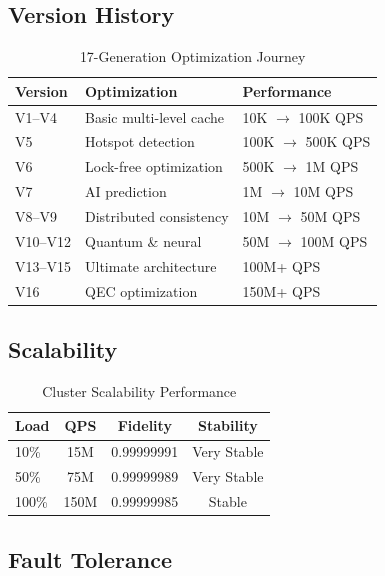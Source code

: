\documentclass[12pt,a4paper]{article}
\theoremstyle{definition}
\begin{document}
\subsection{Version History}

\begin{table}[H]
\centering
\caption{17-Generation Optimization Journey}
\label{tab:history}
\begin{tabular}{lll}
\toprule
\textbf{Version} & \textbf{Optimization} & \textbf{Performance} \\
\midrule
V1--V4 & Basic multi-level cache & 10K $\rightarrow$ 100K QPS \\
V5 & Hotspot detection & 100K $\rightarrow$ 500K QPS \\
V6 & Lock-free optimization & 500K $\rightarrow$ 1M QPS \\
V7 & AI prediction & 1M $\rightarrow$ 10M QPS \\
V8--V9 & Distributed consistency & 10M $\rightarrow$ 50M QPS \\
V10--V12 & Quantum \& neural & 50M $\rightarrow$ 100M QPS \\
V13--V15 & Ultimate architecture & 100M+ QPS \\
V16 & QEC optimization & 150M+ QPS \\
\bottomrule
\end{tabular}
\end{table}

\subsection{Scalability}

\begin{table}[H]
\centering
\caption{Cluster Scalability Performance}
\label{tab:scalability}
\begin{tabular}{lccc}
\toprule
\textbf{Load} & \textbf{QPS} & \textbf{Fidelity} & \textbf{Stability} \\
\midrule
10\% & 15M & 0.99999991 & Very Stable \\
50\% & 75M & 0.99999989 & Very Stable \\
100\% & 150M & 0.99999985 & Stable \\
\bottomrule
\end{tabular}
\end{table}

\subsection{Fault Tolerance}
\end{document}

